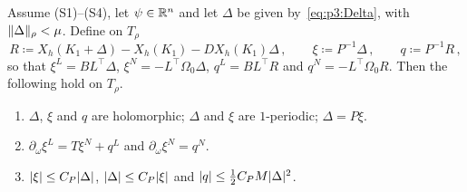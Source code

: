 \begin{lemma}\label{bp:p3:difference-equation}
Assume (S1)--(S4), let $\psi\in\mathbb{R}^n$ and let $\Delta$ be given by~\eqref{eq:p3:Delta}, with
$\lVert \Delta\rVert_\rho<\mu$. Define on $T_\rho$
\begin{equation*}
R\coloneqq X_h(K_1+\Delta)-X_h(K_1)-DX_h(K_1)\Delta\,,\qquad\xi\coloneqq P^{-1}\Delta\,,\qquad
q\coloneqq P^{-1}R\,,
\end{equation*}
so that $\xi^L=BL^\top\Delta$, $\xi^N=-L^\top\Omega_0\Delta$, $q^L=BL^\top R$ and
$q^N=-L^\top\Omega_0R$. Then the following hold on $T_\rho$.
\begin{enumerate}[label=(\alph*)]
\item $\Delta$, $\xi$ and $q$ are holomorphic; $\Delta$ and $\xi$ are $1$-periodic; $\Delta=P\xi$.
\item $\partial_\omega\xi^L=T\xi^N+q^L$ and $\partial_\omega\xi^N=q^N$.
\item $\lvert \xi\rvert\le C_P\lvert \Delta\rvert$, $\lvert \Delta\rvert\le C_P\lvert \xi\rvert$ and $\lvert q\rvert\le\frac12C_PM\lvert \Delta\rvert^2$.
\end{enumerate}
\end{lemma}

